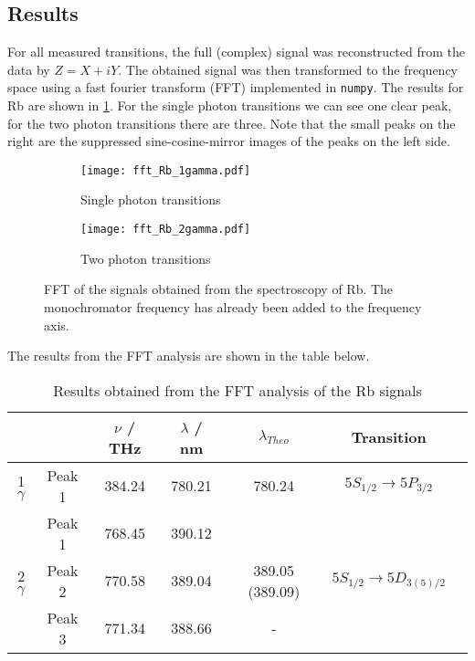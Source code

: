 \documentclass{report}
\begin{document}
\subsection*{Results}
For all measured transitions, the full (complex) signal was reconstructed from the data
 by $Z = X + iY$. The obtained signal was then transformed to the frequency
 space using a fast fourier transform (FFT) implemented in \texttt{numpy}. The results for Rb are shown
 in \ref{fig:Rb_fft}. For the single photon transitions we can see one clear
 peak, for the two photon transitions there are three. Note that the small peaks
 on the right are the suppressed sine-cosine-mirror images of the peaks on
 the left side.
 \begin{figure}[h]
   \centering
   \begin{subfigure}[b]{0.45\textwidth}
     \texttt{[image: fft\_Rb\_1gamma.pdf]}
      \caption{Single photon transitions}     
   \end{subfigure}
   \quad
   \begin{subfigure}[b]{0.45\textwidth}
    \texttt{[image: fft\_Rb\_2gamma.pdf]}  
    \caption{Two photon transitions}
   \end{subfigure}
   \caption{FFT of the signals obtained from the spectroscopy of Rb. The
   monochromator frequency has already been added to the frequency axis.}
   \label{fig:Rb_fft}
 \end{figure}
 The results from the FFT analysis are shown in the table below.
 \begin{table}[h]
   \centering
   \caption{Results obtained from the FFT analysis of the Rb signals}
   \label{tab:Rb_results}
   \begin{tabular}{ccccccc}
      \toprule
      & & $\nu$ / THz  & $\lambda$ / nm  & $\lambda_{Theo}$  & Transition\\
      \midrule
      1$\gamma$ & Peak 1  & 384.24 & 780.21  & 780.24 &
      $5S_{1/2} \rightarrow 5P_{3/2} $\\
      \midrule
      \multirow{3}{*}{2$\gamma$} & Peak 1 & 768.45 & 390.12 &  & \\
                                 & Peak 2 & 770.58  & 389.04 & 389.05 (389.09) &
      $5S_{1/2} \rightarrow 5D_{3(5)/2}$\\
                                 & Peak 3 & 771.34 & 388.66 & - & \\
      \bottomrule
  \end{tabular}
 \end{table}
\end{document}
